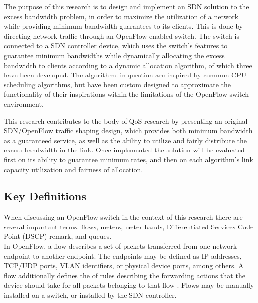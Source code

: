 \documentclass[accepted,single]{gipaper}
\begin{document}
The purpose of this research is to design and implement an SDN solution to the excess bandwidth problem, in order to maximize the utilization of a network while providing minimum bandwidth guarantees to its clients. This is done by directing network traffic through an OpenFlow enabled switch. The switch is connected to a SDN controller device, which uses the switch's features to guarantee minimum bandwidths while dynamically allocating the excess bandwidth to clients according to a dynamic allocation algorithm, of which three have been developed. The algorithms in question are inspired by common CPU scheduling algorithms, but have been custom designed to approximate the functionality of their inspirations within the limitations of the OpenFlow switch environment.

This research contributes to the body of QoS research by presenting an original SDN/OpenFlow traffic shaping design, which provides both minimum bandwidth as a guaranteed service, as well as the ability to utilize and fairly distribute the excess bandwidth in the link. Once implemented the solution will be evaluated first on its ability to guarantee minimum rates, and then on each algorithm's link capacity utilization and fairness of allocation.


\subsection{Key Definitions}
\label{definitions}

When discussing an OpenFlow switch in the context of this research there are several important terms: flows, meters, meter bands, Differentiated Services Code Point (DSCP) remark, and queues.
\\

In OpenFlow, a flow describes a set of packets transferred from one network endpoint to another endpoint. The endpoints may be defined as IP addresses, TCP/UDP ports, VLAN identifiers, or physical device ports, among others. A flow additionally defines the of rules describing the forwarding actions that the device should take for all packets belonging to that flow \cite{flowdef}. Flows may be manually installed on a switch, or installed by the SDN controller.
\end{document}
